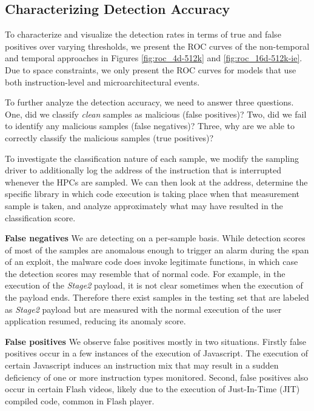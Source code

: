 \documentclass{acm_proc_article-sp}
\begin{document}
\iffalse
	\subsection{Characterizing Detection Accuracy}
	To characterize and visualize the detection rates in terms of true and false positives over varying thresholds, we present the ROC curves of the non-temporal and temporal approaches in Figures \ref{fig:roc_4d-512k} and \ref{fig:roc_16d-512k-ie}. Due to space constraints, we only present the ROC curves for models that use both instruction-level and microarchitectural events.
	
	To further analyze the detection accuracy, we need to answer three questions. One, did we classify \textit{clean} samples as malicious (false positives)? Two, did we fail to identify any malicious samples (false negatives)? Three, why are we able to correctly classify the malicious samples (true positives)?
	
	To investigate the classification nature of each sample, we modify the sampling driver to additionally log the address of the instruction that is interrupted whenever the HPCs are sampled. We can then look at the address, determine the specific library in which code execution is taking place when that measurement sample is taken, and analyze approximately what may have resulted in the classification score.
	
	\textbf{False negatives} \space\space We are detecting on a per-sample basis. While detection scores of most of the samples are anomalous enough to trigger an alarm during the span of an exploit, the malware code does invoke legitimate functions, in which case the detection scores may resemble that of normal code. For example, in the execution of the \textit{Stage2} payload, it is not clear sometimes when the execution of the payload ends. Therefore there exist samples in the testing set that are labeled as \textit{Stage2} payload but are measured with the normal execution of the user application resumed, reducing its anomaly score.
	
	\textbf{False positives} \space\space We observe false positives mostly in two situations. Firstly false positives occur in a few instances of the execution of Javascript. The execution of certain Javascript induces an instruction mix that may result in a sudden deficiency of one or more instruction types monitored. Second, false positives also occur in certain Flash videos, likely due to the execution of Just-In-Time (JIT) compiled code, common in Flash player.
	
\end{document}
